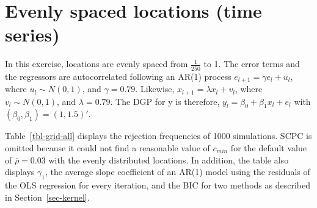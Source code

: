 \documentclass[
]{article}
\begin{document}
\hypertarget{evenly-spaced-locations-time-series}{%
\section{Evenly spaced locations (time
series)}\label{evenly-spaced-locations-time-series}}

In this exercise, locations are evenly spaced from \(\frac{1}{250}\) to
1. The error terms and the regressors are autocorrelated following an
AR(1) process \(e_{l+1}=\gamma e_l+ u_l\), where \(u_l\sim N(0,1)\), and
\(\gamma=0.79\). Likewise, \(x_{l+1}=\lambda x_l+ v_l\), where
\(v_l\sim N(0,1)\), and \(\lambda=0.79\). The DGP for y is therefore,
\(y_l=\beta_0+\beta_1 x_l+e_l\) with \((\beta_0, \beta_1)=(1, 1.5)'\).

Table~\ref{tbl-grid-all} displays the rejection frequencies of 1000
simulations. SCPC is omitted because it could not find a reasonable
value of \(c_{min}\) for the default value of \(\bar\rho=0.03\) with the
evenly distributed locations. In addition, the table also displays
\(\gamma_1\), the average slope coefficient of an AR(1) model using the
residuals of the OLS regression for every iteration, and the BIC for two
methods as described in Section~\ref{sec-kernel}.
\end{document}
